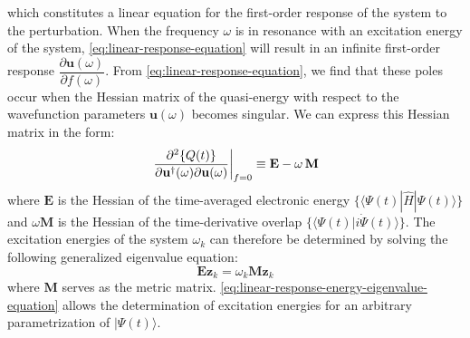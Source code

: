 which constitutes a linear equation for the first-order response of the system
to the perturbation. 
When the frequency $\omega$ is in resonance with an excitation energy of the
system, \cref{eq:linear-response-equation} will result in an infinite
first-order response
\(
    \dfrac{\partial \mathbf{u}(\omega)}{\partial f(\omega)}
\).
From \cref{eq:linear-response-equation}, we find that these poles occur when the
Hessian matrix of the quasi-energy with respect to the wavefunction parameters
\(\mathbf{u}(\omega)\) becomes singular.
We can express this Hessian matrix in the form:
\begin{equation}
    \label{eq:quasi-energy-hessian}
    \left.
        \frac{\partial^2\{Q(t)\}}{%
            \partial \mathbf{u}^\dagger(\omega)
            \partial \mathbf{u}(\omega)
        }
    \right|_{f=0}
    \equiv
    \mathbf{E}
    -
    \omega\,
    \mathbf{M}
\end{equation}
where \(\mathbf{E}\) is the Hessian of the time-averaged electronic energy
\(\{\langle\Psi(t)|\hat{H}|\Psi(t)\rangle\}\) and \(\omega\mathbf{M}\) is the
Hessian of the time-derivative overlap
\(\{\langle\Psi(t)|i\dot{\Psi}(t)\rangle\}\).
The excitation energies of the system $\omega_k$ can therefore be determined by
solving the following generalized eigenvalue equation:
\begin{equation}
    \label{eq:linear-response-energy-eigenvalue-equation}
    \mathbf{E}\mathbf{z}_k
    =
    \omega_k
    \mathbf{M}\mathbf{z}_k
\end{equation}
where \(\mathbf{M}\) serves as the metric matrix.
\cref{eq:linear-response-energy-eigenvalue-equation} allows the determination of
excitation energies for an arbitrary parametrization of $|\Psi(t)\rangle$.


